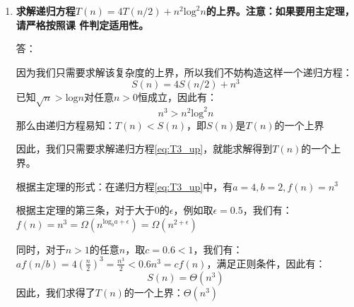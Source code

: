\documentclass[UTF8,12pt,a4paper]{ctexart}
\begin{document}
\begin{enumerate}[1.]
	\item \textbf{求解递归方程$T(n)=4T(n/2)+n^2\text{log}^2n$的上界。注意：如果要用主定理，请严格按照课
	件判定适用性。}

	答：

	因为我们只需要求解该复杂度的上界，所以我们不妨构造这样一个递归方程：
	\begin{equation}
		S(n)=4S(n/2)+n^3
		\label{eq:T3_up}
	\end{equation}
	已知$\sqrt{n} > \text{log}n$对任意$n>0$恒成立，因此有：
	\begin{equation}
		n^3 > n^2\text{log}^2 n
		\label{eq:T3_n_log_relation}
	\end{equation}
	那么由递归方程易知：$T(n) < S(n)$，即$S(n)$是$T(n)$的一个上界

	因此，我们只需要求解递归方程\eqref{eq:T3_up}，就能求解得到$T(n)$的一个上界。

	根据主定理的形式：在递归方程\eqref{eq:T3_up}中，有$a=4, b=2, f(n) = n^3$

	根据主定理的第三条，对于大于0的$\epsilon$，例如取$\epsilon=0.5$，我们有：$f(n) = n^3 = \Omega(n^{\text{log}_b a + \epsilon}) = \Omega({n^{2+\epsilon}})$

	同时，对于$n>1$的任意$n$，取$c=0.6<1$，我们有：$af(n/b)=4(\frac{n}{2})^3=\frac{n^3}{2}<0.6n^3=cf(n)$，满足正则条件，因此有：
	\begin{equation}
		S(n) = \Theta(n^3)
		\label{eq:S}
	\end{equation}
	因此，我们求得了$T(n)$的一个上界：$\Theta({n^3})$

\end{enumerate}
\end{document}
